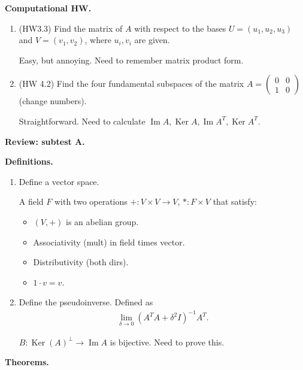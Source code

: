 \documentclass{article}
\newcommand{\mat}[1]{\begin{pmatrix}#1\end{pmatrix}}
\DeclareMathOperator{\Ker}{Ker}
\DeclareMathOperator{\Ima}{Im}
\DeclareMathOperator{\Ima}{Im}
\begin{document}
{\bf Computational HW.}

\begin{enumerate}
  \item (HW3.3) Find the matrix of $A$ with respect to the bases $U = (u_1, u_2, u_3)$ and $V =(v_1, v_2)$, where $u_i, v_i$ are given.

    Easy, but annoying.  Need to remember matrix product form.

  \item (HW 4.2) Find the four fundamental subspaces of the matrix $A = \mat{0 & 0 \\ 1 & 0}$ (change numbers).

    Straightforward.  Need to calculate $\Ima A, \Ker A, \Ima A^T, \Ker A^T$.
\end{enumerate}

{\bf Review: subtest A.}

{\bf Definitions.}
\begin{enumerate}
  \item Define a vector space.


    A field $F$ with two operations $+: V \times V \to V$, $* : F \times V$ that satisfy:

    \begin{itemize}
      \item $(V, +)$ is an abelian group.
      \item Associativity (mult) in field times vector.
      \item Distributivity (both dirs).
      \item $1 \cdot v = v$.
    \end{itemize}


  \item Define the pseudoinverse.  Defined as
    \begin{align*}
      \lim_{\delta \to 0} (A^T A + \delta^2 I)^{-1} A^T.
    \end{align*}

    $B: \Ker(A)^{\perp} \to \Ima A$ is bijective.  Need to prove this.
\end{enumerate}

{\bf Theorems.}
\end{document}
